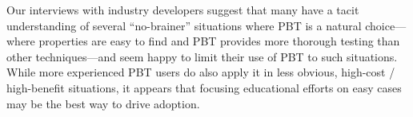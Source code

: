 {%


%
Our interviews with industry developers suggest that many
have a tacit
understanding of several ``no-brainer'' situations where PBT is a natural
choice---where properties are easy to find and PBT provides
more thorough testing than other techniques---and
seem happy to limit their use of PBT to such situations.
While more experienced PBT users do also apply it in less obvious,
high-cost / high-benefit situations, it appears that
focusing educational efforts on easy cases may be the best way to
drive adoption.

}
